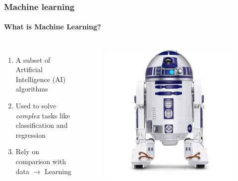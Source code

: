 \documentclass[aspectratio=43]{beamer}
\begin{document}
\begin{frame}

	\frametitle{Machine learning}
	\framesubtitle{What is Machine Learning?}
	\begin{columns}
		
		
		\begin{enumerate}
			\item A subset of Artificial Intelligence (AI) algorithms 
			\item Used to solve \textit{complex} tasks like classification and regression
			\item Rely on comparison with data $\longrightarrow$ {\color{red}Learning}
		\end{enumerate}
		
		\begin{figure}[!htb]
			\includegraphics[width = \linewidth]{r2d2.jpeg}
		\end{figure}
	
	\end{columns}

\end{frame}
\end{document}
